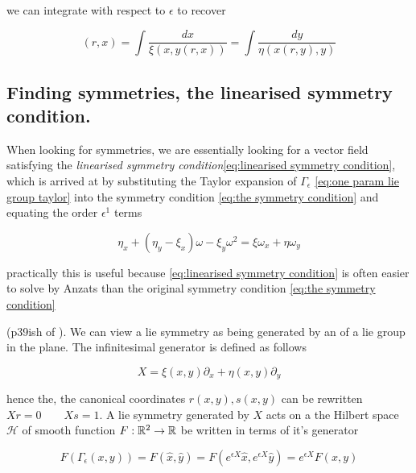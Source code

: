 \documentclass[12pt]{article}
\begin{document}
we can integrate with respect to $\epsilon$ to recover  

\begin{equation}\label{eq:solving for s}(r,x) = \int \frac{dx}{\xi(x,y(r,x))} = \int \frac{dy}{\eta(x(r,y),y)}
\end{equation} 

\subsection{Finding symmetries, the linearised symmetry condition.}

When looking for symmetries, we are essentially looking for a vector field satisfying  the \textit{linearised symmetry condition}\eqref{eq:linearised symmetry condition}, which is arrived at by substituting the Taylor expansion of $\Gamma_\epsilon$ \eqref{eq:one param lie group taylor} into the symmetry condition \eqref{eq:the symmetry condition} and equating the order $\epsilon^1$ terms

\begin{equation}\label{eq:linearised symmetry condition}
    \eta_x + (\eta_y - \xi_x)\omega - \xi_y\omega^2 = \xi \omega_x + \eta \omega_y
\end{equation}

practically this is useful because \eqref{eq:linearised symmetry condition} is often easier to solve by Anzats than the original symmetry condition \eqref{eq:the symmetry condition}

(p39ish of \cite{Symmetry-methods}). We can view a lie symmetry as being generated by an  of a lie group in the plane. The infinitesimal generator is defined as follows

\begin{equation}\label{eq:infinitesimal operator}
    X = \xi(x,y)\partial_x + \eta(x,y)\partial_y
\end{equation}

hence the, the canonical coordinates $r(x,y),s(x,y)$ can be rewritten $Xr = 0\qquad Xs = 1$. A lie symmetry generated by $X$ acts on a the Hilbert space $\mathcal H$ of smooth function $F : \mathbb{R}^2 \to \mathbb{R}$ be written in terms of it's generator

\begin{equation}\label{eq:generator of lie symmetry}
    F(\Gamma_\epsilon (x,y)) = F(\hat x,\hat y) = F(e^{\epsilon X}\hat x , e^{\epsilon X}\hat y) = e^{\epsilon X} F(x,y)
\end{equation}
\end{document}

